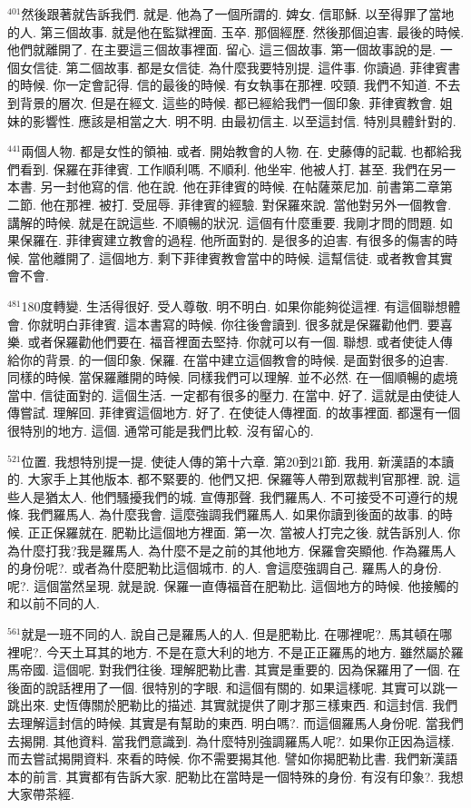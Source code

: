 \documentclass{book}
\begin{document}
$^{401}$然後跟著就告訴我們.
就是.
他為了一個所謂的.
婢女.
信耶穌.
以至得罪了當地的人.
第三個故事.
就是他在監獄裡面.
玉卒.
那個經歷.
然後那個迫害.
最後的時候.
他們就離開了.
在主要這三個故事裡面.
留心.
這三個故事.
第一個故事說的是.
一個女信徒.
第二個故事.
都是女信徒.
為什麼我要特別提.
這件事.
你讀過.
菲律賓書的時候.
你一定會記得.
信的最後的時候.
有女執事在那裡.
咬頸.
我們不知道.
不去到背景的層次.
但是在經文.
這些的時候.
都已經給我們一個印象.
菲律賓教會.
姐妹的影響性.
應該是相當之大.
明不明.
由最初信主.
以至這封信.
特別具體針對的.

$^{441}$兩個人物.
都是女性的領袖.
或者.
開始教會的人物.
在.
史藤傳的記載.
也都給我們看到.
保羅在菲律賓.
工作順利嗎.
不順利.
他坐牢.
他被人打.
甚至.
我們在另一本書.
另一封他寫的信.
他在說.
他在菲律賓的時候.
在帖薩萊尼加.
前書第二章第二節.
他在那裡.
被打.
受屈辱.
菲律賓的經驗.
對保羅來說.
當他對另外一個教會.
講解的時候.
就是在說這些.
不順暢的狀況.
這個有什麼重要.
我剛才問的問題.
如果保羅在.
菲律賓建立教會的過程.
他所面對的.
是很多的迫害.
有很多的傷害的時候.
當他離開了.
這個地方.
剩下菲律賓教會當中的時候.
這幫信徒.
或者教會其實會不會.

$^{481}$180度轉變.
生活得很好.
受人尊敬.
明不明白.
如果你能夠從這裡.
有這個聯想體會.
你就明白菲律賓.
這本書寫的時候.
你往後會讀到.
很多就是保羅勸他們.
要喜樂.
或者保羅勸他們要在.
福音裡面去堅持.
你就可以有一個.
聯想.
或者使徒人傳給你的背景.
的一個印象.
保羅.
在當中建立這個教會的時候.
是面對很多的迫害.
同樣的時候.
當保羅離開的時候.
同樣我們可以理解.
並不必然.
在一個順暢的處境當中.
信徒面對的.
這個生活.
一定都有很多的壓力.
在當中.
好了.
這就是由使徒人傳嘗試.
理解回.
菲律賓這個地方.
好了.
在使徒人傳裡面.
的故事裡面.
都還有一個很特別的地方.
這個.
通常可能是我們比較.
沒有留心的.

$^{521}$位置.
我想特別提一提.
使徒人傳的第十六章.
第20到21節.
我用.
新漢語的本讀的.
大家手上其他版本.
都不緊要的.
他們又把.
保羅等人帶到眾裁判官那裡.
說.
這些人是猶太人.
他們騷擾我們的城.
宣傳那聲.
我們羅馬人.
不可接受不可遵行的規條.
我們羅馬人.
為什麼我會.
這麼強調我們羅馬人.
如果你讀到後面的故事.
的時候.
正正保羅就在.
肥勒比這個地方裡面.
第一次.
當被人打完之後.
就告訴別人.
你為什麼打我?我是羅馬人.
為什麼不是之前的其他地方.
保羅會突顯他.
作為羅馬人的身份呢?.
或者為什麼肥勒比這個城市.
的人.
會這麼強調自己.
羅馬人的身份.
呢?.
這個當然呈現.
就是說.
保羅一直傳福音在肥勒比.
這個地方的時候.
他接觸的和以前不同的人.

$^{561}$就是一班不同的人.
說自己是羅馬人的人.
但是肥勒比.
在哪裡呢?.
馬其頓在哪裡呢?.
今天土耳其的地方.
不是在意大利的地方.
不是正正羅馬的地方.
雖然屬於羅馬帝國.
這個呢.
對我們往後.
理解肥勒比書.
其實是重要的.
因為保羅用了一個.
在後面的說話裡用了一個.
很特別的字眼.
和這個有關的.
如果這樣呢.
其實可以跳一跳出來.
史恆傳關於肥勒比的描述.
其實就提供了剛才那三樣東西.
和這封信.
我們去理解這封信的時候.
其實是有幫助的東西.
明白嗎?.
而這個羅馬人身份呢.
當我們去揭開.
其他資料.
當我們意識到.
為什麼特別強調羅馬人呢?.
如果你正因為這樣.
而去嘗試揭開資料.
來看的時候.
你不需要揭其他.
譬如你揭肥勒比書.
我們新漢語本的前言.
其實都有告訴大家.
肥勒比在當時是一個特殊的身份.
有沒有印象?.
我想大家帶茶經.
\end{document}
